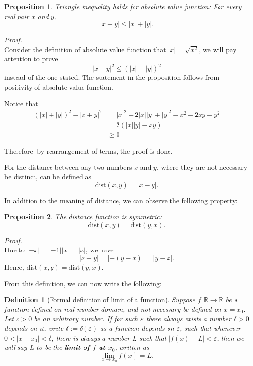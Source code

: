 \documentclass[12pt]{article}
\newtheorem{definition}{Definition}[section]
\newtheorem*{proposition}{Proposition}
\renewenvironment{proof}[1][Proof]{\begin{snugshade*} \underline{\textit{{#1}.}}\\}{\hfill \qedsymbol \end{snugshade*}}
\begin{document}
    \begin{proposition}
        Triangle inequality holds for absolute value function: For every real pair $x$ and $y$, \[|x+y|\leq |x|+|y|.\]
    \end{proposition}

    \begin{proof}
        Consider the definition of absolute value function that $|x|=\sqrt{x^2}$, we will pay attention to prove \[|x+y|^2\leq (|x|+|y|)^2\] instead of the one stated. The statement in the proposition follows from positivity of absolute value function.

        Notice that \begin{align*}
            (|x|+|y|)^2-|x+y|^2&=|x|^2+2|x||y|+|y|^2-x^2-2xy-y^2\\
            &=2(|x||y|-xy)\\
            &\geq 0
        \end{align*}

        Therefore, by rearrangement of terms, the proof is done.
    \end{proof}

    For the distance between any two numbers $x$ and $y$, where they are not necessary be distinct, can be defined as \[\mathrm{dist}(x,y)=|x-y|.\]

    In addition to the meaning of distance, we can observe the following property:

    \begin{proposition}
        The distance function is symmetric: \[\mathrm{dist}(x,y)=\mathrm{dist}(y,x).\]
    \end{proposition}

    \begin{proof}
        Due to $|-x|=|-1||x|=|x|$, we have \[|x-y|=|-(y-x)|=|y-x|.\]
        Hence, $\mathrm{dist}(x,y)=\mathrm{dist}(y,x)$.
    \end{proof}

    From this definition, we can now write the following:

    \begin{definition}[Formal definition of limit of a function]
        Suppose $f:\mathbb{R}\to\mathbb{R}$ be a function defined on real number domain, and not necessary be defined on $x=x_0$. Let $\varepsilon>0$ be an arbitrary number. If for such $\varepsilon$ there always exists a number $\delta>0$ depends on it, write $\delta:=\delta(\varepsilon)$ as a function depends on $\varepsilon$, such that whenever $0<|x-x_0|<\delta$, there is always a number $L$ such that $|f(x)-L|<\varepsilon$, then we will say $L$ to be the \textbf{limit of $f$ at $x_0$}, written as \[\lim_{x\to x_0}f(x)=L.\]
    \end{definition}
\end{document}
